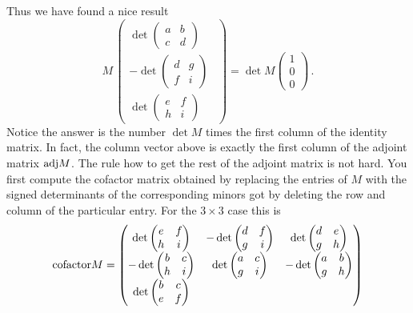 {Thus we have found a nice result
\[
M \, \begin{pmatrix} \det\begin{pmatrix}a&b\\c&d\end{pmatrix}\\[2mm]
-\det\begin{pmatrix}d&g\\f&i\end{pmatrix}\ \ \\[2mm]
\det\begin{pmatrix}e&f\\h&i\end{pmatrix}\end{pmatrix}
=\det M \begin{pmatrix}1\\0\\0\end{pmatrix}\, .
\]
Notice the answer is the number $\det M$ times the first column of the identity matrix.
In fact, the column vector above is exactly the first column of the adjoint matrix ${\rm adj} M$.
The rule how to get the rest of the adjoint matrix is not hard. You first compute the cofactor matrix obtained by replacing the entries of $M$ with the signed determinants of the corresponding 
minors got by deleting the row and column of the particular entry. For the $3\times 3$ case this is
\[
{\rm cofactor} M = 
\begin{pmatrix} \det\begin{pmatrix}e&f\\h&i\end{pmatrix}
&-\det\begin{pmatrix}d&f\\g&i\end{pmatrix}
&\det\begin{pmatrix}d&e\\g&h\end{pmatrix}
\\[2mm]
-\det\begin{pmatrix}b&c\\h&i\end{pmatrix}
&\det\begin{pmatrix}a&c\\g&i\end{pmatrix}
&-\det\begin{pmatrix}a&b\\g&h\end{pmatrix}\\[2mm]
\det\begin{pmatrix}b&c\\e&f\end{pmatrix}

\end{pmatrix}\]}
